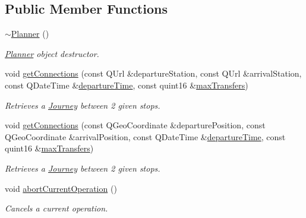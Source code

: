 \subsection*{Public Member Functions}
\begin{DoxyCompactItemize}
\item 
\mbox{\hyperlink{classQRail_1_1RouterEngine_1_1Planner_a3ef159b1f214b7e7f2aecb94d1a2bbed}{$\sim$\+Planner}} ()
\begin{DoxyCompactList}\small\item\em \mbox{\hyperlink{classQRail_1_1RouterEngine_1_1Planner}{Planner}} object destructor. \end{DoxyCompactList}\item 
void \mbox{\hyperlink{classQRail_1_1RouterEngine_1_1Planner_aad16ab26f3de5ffd3193c97479b84a95}{get\+Connections}} (const Q\+Url \&departure\+Station, const Q\+Url \&arrival\+Station, const Q\+Date\+Time \&\mbox{\hyperlink{classQRail_1_1RouterEngine_1_1Planner_af4816b0cc2e734bacb89d14c682ea7c5}{departure\+Time}}, const quint16 \&\mbox{\hyperlink{classQRail_1_1RouterEngine_1_1Planner_ab9a0ae139db0618220d8d069e983c394}{max\+Transfers}})
\begin{DoxyCompactList}\small\item\em Retrieves a \mbox{\hyperlink{classQRail_1_1RouterEngine_1_1Journey}{Journey}} between 2 given stops. \end{DoxyCompactList}\item 
void \mbox{\hyperlink{classQRail_1_1RouterEngine_1_1Planner_ade8a2f54fea0e510bc379a5d537c67ea}{get\+Connections}} (const Q\+Geo\+Coordinate \&departure\+Position, const Q\+Geo\+Coordinate \&arrival\+Position, const Q\+Date\+Time \&\mbox{\hyperlink{classQRail_1_1RouterEngine_1_1Planner_af4816b0cc2e734bacb89d14c682ea7c5}{departure\+Time}}, const quint16 \&\mbox{\hyperlink{classQRail_1_1RouterEngine_1_1Planner_ab9a0ae139db0618220d8d069e983c394}{max\+Transfers}})
\begin{DoxyCompactList}\small\item\em Retrieves a \mbox{\hyperlink{classQRail_1_1RouterEngine_1_1Journey}{Journey}} between 2 given stops. \end{DoxyCompactList}\item 
void \mbox{\hyperlink{classQRail_1_1RouterEngine_1_1Planner_a6098ae8b5db4f0c9cfe4352486ac4fc1}{abort\+Current\+Operation}} ()
\begin{DoxyCompactList}\small\item\em Cancels a current operation. \end{DoxyCompactList}\item 

\end{DoxyCompactItemize}
